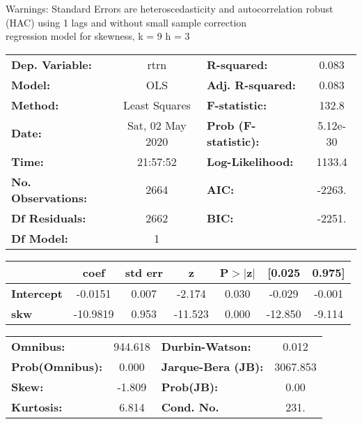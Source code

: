 Warnings: \newline
 [1] Standard Errors are heteroscedasticity and autocorrelation robust (HAC) using 1 lags and without small sample correction\\ 

regression model for skewness, k = 9 h = 3\begin{center}
\begin{tabular}{lclc}
\toprule
\textbf{Dep. Variable:}    &       rtrn       & \textbf{  R-squared:         } &     0.083   \\
\textbf{Model:}            &       OLS        & \textbf{  Adj. R-squared:    } &     0.083   \\
\textbf{Method:}           &  Least Squares   & \textbf{  F-statistic:       } &     132.8   \\
\textbf{Date:}             & Sat, 02 May 2020 & \textbf{  Prob (F-statistic):} &  5.12e-30   \\
\textbf{Time:}             &     21:57:52     & \textbf{  Log-Likelihood:    } &    1133.4   \\
\textbf{No. Observations:} &        2664      & \textbf{  AIC:               } &    -2263.   \\
\textbf{Df Residuals:}     &        2662      & \textbf{  BIC:               } &    -2251.   \\
\textbf{Df Model:}         &           1      & \textbf{                     } &             \\
\bottomrule
\end{tabular}
\begin{tabular}{lcccccc}
                   & \textbf{coef} & \textbf{std err} & \textbf{z} & \textbf{P$> |$z$|$} & \textbf{[0.025} & \textbf{0.975]}  \\
\midrule
\textbf{Intercept} &      -0.0151  &        0.007     &    -2.174  &         0.030        &       -0.029    &       -0.001     \\
\textbf{skw}       &     -10.9819  &        0.953     &   -11.523  &         0.000        &      -12.850    &       -9.114     \\
\bottomrule
\end{tabular}
\begin{tabular}{lclc}
\textbf{Omnibus:}       & 944.618 & \textbf{  Durbin-Watson:     } &    0.012  \\
\textbf{Prob(Omnibus):} &   0.000 & \textbf{  Jarque-Bera (JB):  } & 3067.853  \\
\textbf{Skew:}          &  -1.809 & \textbf{  Prob(JB):          } &     0.00  \\
\textbf{Kurtosis:}      &   6.814 & \textbf{  Cond. No.          } &     231.  \\
\bottomrule
\end{tabular}
\end{center}

